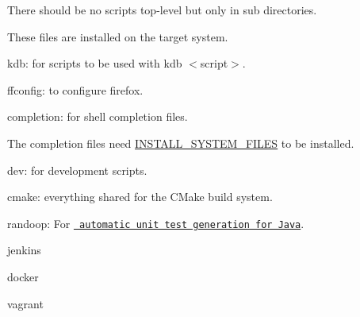 There should be no scripts top-\/level but only in sub directories.

These files are installed on the target system.


\begin{DoxyItemize}
\item kdb\+: for scripts to be used with {\ttfamily kdb $<$script$>$}.
\item ffconfig\+: to configure firefox.
\item completion\+: for shell completion files.
\end{DoxyItemize}

The completion files need \mbox{\hyperlink{doc_COMPILE_md}{I\+N\+S\+T\+A\+L\+L\+\_\+\+S\+Y\+S\+T\+E\+M\+\_\+\+F\+I\+L\+ES}} to be installed.


\begin{DoxyItemize}
\item dev\+: for development scripts.
\item cmake\+: everything shared for the C\+Make build system.
\item randoop\+: For \href{https://randoop.github.io/randoop/}{\texttt{ automatic unit test generation for Java}}.
\end{DoxyItemize}


\begin{DoxyItemize}
\item jenkins
\item docker
\item vagrant 
\end{DoxyItemize}